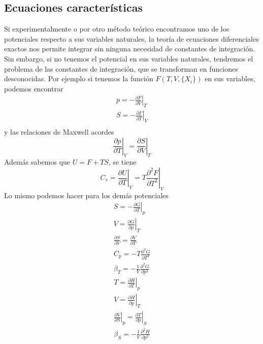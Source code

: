 \subsection{Ecuaciones características}
Si experimentalmente o por otro método teórico encontramos uno de los potenciales respecto a sus variables naturales, la teoría de ecuaciones diferenciales exactos nos permite integrar sin ninguna necesidad de constantes de integración.
Sin embargo, si no tenemos el potencial en sus variables naturales, tendremos el problema de las constantes de integración, que se transforman en funciones desconocidas.
Por ejemplo si tenemos la función $F(T,V,\{X_i\})$ en sus variables, podemos encontrar
\begin{equation}
\begin{gathered}
p = - \left.\frac{\partial F}{\partial V}\right|_{T}\\
S = - \left.\frac{\partial F}{\partial T}\right|_{V}\\
\end{gathered}
\end{equation}
y las relaciones de Maxwell acordes
\begin{equation}
\left.\frac{\partial p}{\partial T}\right|_V = \left.\frac{\partial S}{\partial V}\right|_T
\end{equation}
Además sabemos que $U = F + TS$, se tiene
\begin{equation}
C_v = \left.\frac{\partial U}{\partial T}\right|_V = T \left.\frac{\partial^2 F}{\partial T^2}\right|_V
\end{equation}
Lo mismo podemos hacer para los demás potenciales
\begin{equation}
\begin{gathered}
S = - \left.\frac{\partial G}{\partial T}\right|_p\\
V = \left.\frac{\partial G}{\partial p}\right|_T\\
\frac{\partial S}{\partial V} = \frac{\partial V}{\partial T}\\
C_p = -T \frac{\partial^2 G}{\partial T^2}\\
\beta_T = - \frac{1}{V} \frac{\partial^2 G}{\partial p^2}
\end{gathered}
\end{equation}
\begin{equation}
\begin{gathered}
T = \left.\frac{\partial H}{\partial T}\right|_p\\
V = \left.\frac{\partial H}{\partial p}\right|_T\\
\left.\frac{\partial V}{\partial S}\right|_p = \left.\frac{\partial T}{\partial p}\right|_S\\
\beta_S = - \frac{1}{V} \frac{\partial^2 H}{\partial p^2}
\end{gathered}
\end{equation}
